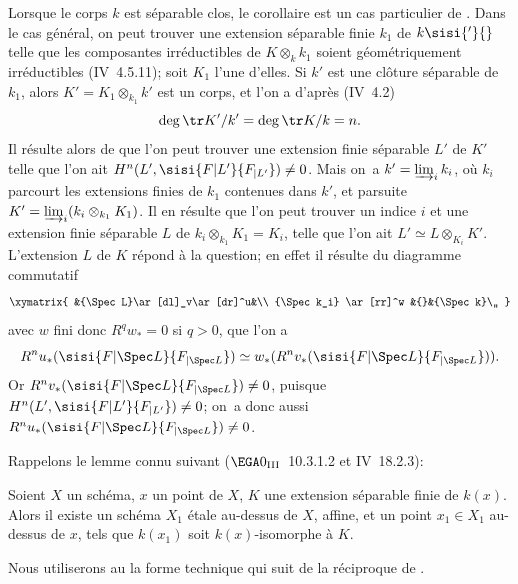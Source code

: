 Lorsque le corps $k$ est s\'eparable clos, le corollaire est un cas particulier de . Dans le cas g\'en\'eral, on peut trouver une extension s\'eparable finie $k_1$ de $k\sisi{'}{}$ telle que les composantes irr\'eductibles de $K \otimes_k k_1$ soient g\'eom\'etriquement irr\'eductibles (\EGA IV~4.5.11); soit $K_1$ l'une d'elles. Si $k'$ est une cl\^{o}ture s\'eparable de $k_1$, alors $K' = K_1 \otimes_{k_1} k'$ est un corps, et l'on a d'apr\`es (\EGA IV~4.2)
$$
\deg \tr K'/k' = \deg \tr K/k = n.
$$
Il r\'esulte alors de  que l'on peut trouver une extension finie s\'eparable $L'$ de $K'$ telle que l'on ait $H^n(L', \sisi{F{|L'}}{F_{|L'}}) \neq 0$. Mais on~a $k' = \varinjlim_i k_i$, o\`u $k_i$ parcourt les extensions finies de $k_1$ contenues dans $k'$, et par\pageoriginale suite $K' = \varinjlim_i (k_i \otimes_{k_1} K_1)$. Il en r\'esulte que l'on peut trouver un indice $i$ et une extension finie s\'eparable $L$ de $k_i \otimes_{k_1} K_1 =K_i$, telle que l'on ait $L' \simeq L \otimes_{K_i} K'$. L'extension $L$ de $K$ r\'epond \`a la question; en effet il r\'esulte du diagramme commutatif
$$
\xymatrix{
&{\Spec L}\ar[dl]_v\ar[dr]^u&\\
{\Spec k_i} \ar[rr]^w &{}&{\Spec k}\,,
}
$$
avec $w$ fini donc $R^q w_* = 0$ si $q>0$, que l'on a
$$R^n u_*(\sisi{F{|\Spec L}}{F_{|\Spec L}}) \simeq w_*(R^n v_*(\sisi{F{|\Spec L}}{F_{|\Spec L}})).
$$
Or $R^nv_*(\sisi{F{|\Spec L}}{F_{|\Spec L}}) \neq 0$, puisque $H^n(L', \sisi{F{|L'}}{F_{|L'}}) \neq 0$; on~a donc aussi $R^nu_*(\sisi{F{|\Spec L}}{F_{|\Spec L}}) \neq 0$.

Rappelons le lemme connu suivant (\cf $\EGA 0_{\textup{III}}$~10.3.1.2 et \EGA IV~18.2.3):

\begin{lemme} \label{XIV.3.4}
Soient $X$ un sch\'ema, $x$ un point de $X$, $K$ une extension s\'eparable finie de $k(x)$. Alors il existe un sch\'ema $X_1$ \'etale au-dessus de $X$, affine, et un point $x_1 \in X_1$ au-dessus de $x$, tels que $k(x_1)$ soit $k(x)$-isomorphe \`a $K$.
\end{lemme}

Nous utiliserons au \numero {} la forme technique qui suit de la r\'eciproque de .

